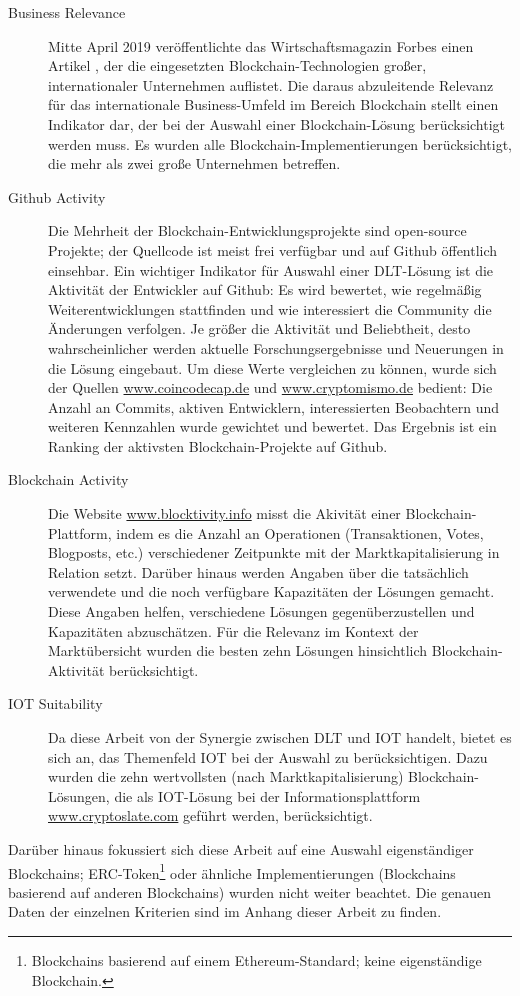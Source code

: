 \begin{description}
  \item[Business Relevance] Mitte April 2019 veröffentlichte das Wirtschaftsmagazin Forbes einen Artikel \cite{castillo2019}, der die eingesetzten Blockchain-Technologien großer, internationaler Unternehmen auflistet. Die daraus abzuleitende Relevanz für das internationale Business-Umfeld im Bereich Blockchain stellt einen Indikator dar, der bei der Auswahl einer Blockchain-Lösung berücksichtigt werden muss. Es wurden alle Blockchain-Implementierungen berücksichtigt, die mehr als zwei große Unternehmen betreffen.
  \item[Github Activity] Die Mehrheit der Blockchain-Entwicklungsprojekte sind open-source Projekte; der Quellcode ist meist frei verfügbar und auf Github öffentlich einsehbar. Ein wichtiger Indikator für Auswahl einer \ac{DLT}-Lösung ist die Aktivität der Entwickler auf Github: Es wird bewertet, wie regelmäßig Weiterentwicklungen stattfinden und wie interessiert die Community die Änderungen verfolgen. Je größer die Aktivität und Beliebtheit, desto wahrscheinlicher werden aktuelle Forschungsergebnisse und Neuerungen in die Lösung eingebaut. Um diese Werte vergleichen zu können, wurde sich der Quellen \url{www.coincodecap.de} und \url{www.cryptomismo.de} bedient: Die Anzahl an Commits, aktiven Entwicklern, interessierten Beobachtern und weiteren Kennzahlen wurde gewichtet und bewertet. Das Ergebnis ist ein Ranking der aktivsten Blockchain-Projekte auf Github.
  \item[Blockchain Activity] Die Website \url{www.blocktivity.info} misst die Akivität einer Blockchain-Plattform, indem es die Anzahl an Operationen (Transaktionen, Votes, Blogposts, etc.) verschiedener Zeitpunkte mit der Marktkapitalisierung in Relation setzt. Darüber hinaus werden Angaben über die tatsächlich verwendete und die noch verfügbare Kapazitäten der Lösungen gemacht. Diese Angaben helfen, verschiedene Lösungen gegenüberzustellen und Kapazitäten abzuschätzen. Für die Relevanz im Kontext der Marktübersicht wurden die besten zehn Lösungen hinsichtlich Blockchain-Aktivität berücksichtigt.
  \item[IOT Suitability] Da diese Arbeit von der Synergie zwischen \ac{DLT} und \ac{IOT} handelt, bietet es sich an, das Themenfeld \ac{IOT} bei der Auswahl zu berücksichtigen. Dazu wurden die zehn wertvollsten (nach Marktkapitalisierung) Blockchain-Lösungen, die als \ac{IOT}-Lösung bei der Informationsplattform \url{www.cryptoslate.com} geführt werden, berücksichtigt.
\end{description}
Darüber hinaus fokussiert sich diese Arbeit auf eine Auswahl eigenständiger Blockchains; ERC-Token\footnote{Blockchains basierend auf einem Ethereum-Standard; keine eigenständige Blockchain.} oder ähnliche Implementierungen (Blockchains basierend auf anderen Blockchains) wurden nicht weiter beachtet. Die genauen Daten der einzelnen Kriterien sind im Anhang dieser Arbeit zu finden.

